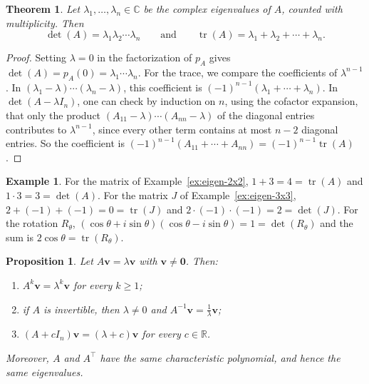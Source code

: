 \documentclass[11pt]{article}
\theoremstyle{definition}
\newtheorem{example}[definition]{Example}
\theoremstyle{plain}
\newtheorem{theorem}[definition]{Theorem}
\newtheorem{proposition}[definition]{Proposition}
\theoremstyle{remark}
\DeclareMathOperator{\tr}{tr}
\begin{document}
\begin{theorem}\label{thm:trace-det-eigen}
    Let $\lambda_1, \ldots, \lambda_n \in \mathbb{C}$ be the complex eigenvalues of $A$, counted with multiplicity. Then
    \[\det(A) = \lambda_1 \lambda_2 \cdots \lambda_n \qquad \text{and} \qquad \tr(A) = \lambda_1 + \lambda_2 + \cdots + \lambda_n.\]
\end{theorem}

\begin{proof}
    Setting $\lambda = 0$ in the factorization of $p_A$ gives $\det(A) = p_A(0) = \lambda_1 \cdots \lambda_n$. For the trace, we compare the coefficients of $\lambda^{n-1}$. In $(\lambda_1 - \lambda) \cdots (\lambda_n - \lambda)$, this coefficient is $(-1)^{n-1}(\lambda_1 + \cdots + \lambda_n)$. In $\det(A - \lambda I_n)$, one can check by induction on $n$, using the cofactor expansion, that only the product $(A_{11} - \lambda) \cdots (A_{nn} - \lambda)$ of the diagonal entries contributes to $\lambda^{n-1}$, since every other term contains at most $n - 2$ diagonal entries. So the coefficient is $(-1)^{n-1}(A_{11} + \cdots + A_{nn}) = (-1)^{n-1}\tr(A)$.
\end{proof}

\begin{example}
    For the matrix of Example~\ref{ex:eigen-2x2}, $1 + 3 = 4 = \tr(A)$ and $1 \cdot 3 = 3 = \det(A)$. For the matrix $J$ of Example~\ref{ex:eigen-3x3}, $2 + (-1) + (-1) = 0 = \tr(J)$ and $2 \cdot (-1) \cdot (-1) = 2 = \det(J)$. For the rotation $R_\theta$, $(\cos\theta + i\sin\theta)(\cos\theta - i\sin\theta) = 1 = \det(R_\theta)$ and the sum is $2\cos\theta = \tr(R_\theta)$.
\end{example}

\begin{proposition}\label{prop:eigen-related}
    Let $A\mathbf{v} = \lambda \mathbf{v}$ with $\mathbf{v} \neq \mathbf{0}$. Then:
    \begin{enumerate}
        \item $A^k \mathbf{v} = \lambda^k \mathbf{v}$ for every $k \geq 1$;
        \item if $A$ is invertible, then $\lambda \neq 0$ and $A^{-1} \mathbf{v} = \frac{1}{\lambda} \mathbf{v}$;
        \item $(A + cI_n)\mathbf{v} = (\lambda + c)\mathbf{v}$ for every $c \in \mathbb{R}$.
    \end{enumerate}
    Moreover, $A$ and $A^\top$ have the same characteristic polynomial, and hence the same eigenvalues.
\end{proposition}
\end{document}
